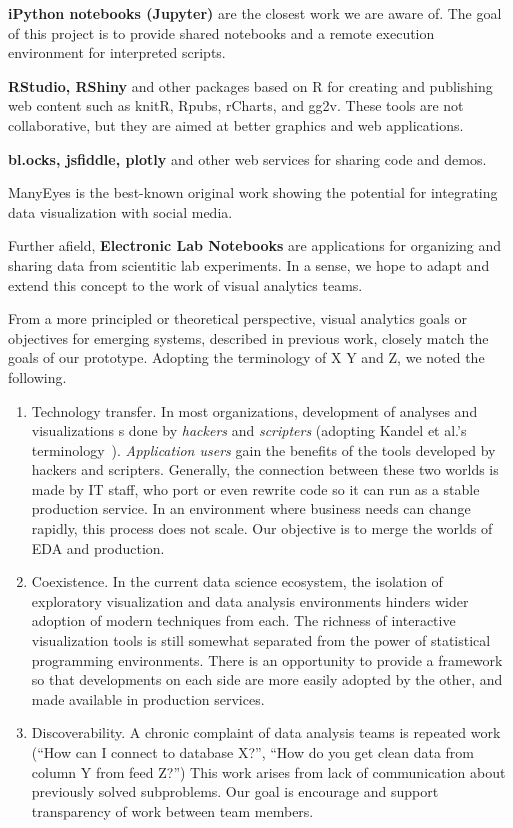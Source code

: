 {\bf iPython notebooks (Jupyter)} are the closest work we are aware of.
The goal of this project is to provide shared notebooks and a remote
execution environment for interpreted scripts. 

{\bf RStudio, RShiny} and other packages based on R for creating and
publishing web content such as knitR, Rpubs, rCharts, and gg2v.
These tools are not collaborative, but they are aimed at better
graphics and web applications.

{\bf bl.ocks, jsfiddle, plotly} and other web services for sharing code
and demos.

{ManyEyes} is the best-known original work showing the potential for
integrating data visualization with social media.

Further afield, {\bf Electronic Lab Notebooks} are applications for organizing
and sharing data from scientitic lab experiments\cite{Rubacha:ELN:2011}.
In a sense, we hope to adapt and extend this concept to the work of
visual analytics teams.

From a more principled or theoretical perspective, visual analytics goals
or objectives for emerging systems, described in previous work, closely match
the goals of our prototype. Adopting the terminology of X Y and Z, we noted
the following.

\begin{enumerate}

\item Technology transfer.
In most organizations, development of analyses and visualizations 
s done by \emph{hackers} and \emph{scripters} (adopting Kandel et al.'s
terminology~\cite{Kandel:2012:EDA}). \emph{Application users} 
gain the benefits of the tools developed by hackers and scripters.
Generally, the connection between these two worlds is made by IT staff,
who port or even rewrite code so it can run as a stable production service.
In an environment where business needs can change rapidly, this
process does not scale. Our objective is to merge the worlds
of EDA and production.

\item Coexistence. In the current data science ecosystem, the
isolation of exploratory visualization and data analysis
environments hinders wider adoption of modern techniques from each.
The richness of interactive visualization tools is still somewhat
separated from the power of statistical programming environments.
There is an opportunity to provide a framework so that developments
on each side are more easily adopted by the other, and made available
in production services.

\item Discoverability. A chronic complaint of data analysis teams is
repeated work (``How can I connect to database X?'', ``How do you get
clean data from column Y from feed Z?'') This work arises from lack of
communication about previously solved subproblems. Our goal is encourage
and support transparency of work between team members.

\end{enumerate}
